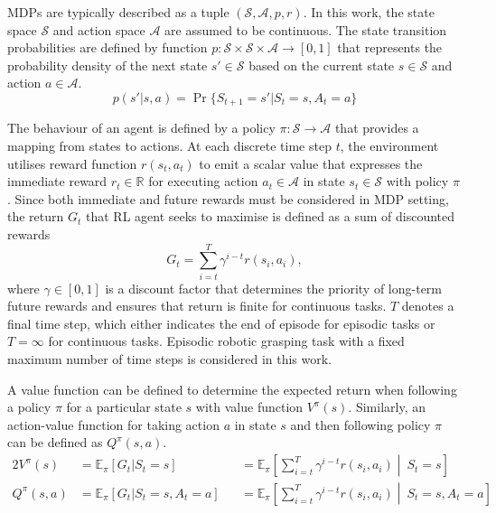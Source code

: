 MDPs are typically described as a tuple \((\mathcal{S}, \mathcal{A}, p, r)\). In this work, the state space \(\mathcal{S}\) and action space \(\mathcal{A}\) are assumed to be continuous. The state transition probabilities are defined by function \(p : \mathcal{S} \times \mathcal{S} \times \mathcal{A} \rightarrow [0, 1]\) that represents the probability density of the next state \(s' \in \mathcal{S}\) based on the current state \(s \in \mathcal{S}\) and action \(a \in \mathcal{A}\).
\begin{equation}
    p(s' \vert s, a) = \Pr\{S_{t+1}{=}s' \vert S_t{=}s, A_{t}{=}a\}
\end{equation}

The behaviour of an agent is defined by a policy \(\pi : \mathcal{S} \rightarrow \mathcal{A}\) that provides a mapping from states to actions. At each discrete time step \(t\), the environment utilises reward function \(r(s_{t}, a_{t})\) to emit a scalar value that expresses the immediate reward \(r_{t} \in \mathbb{R}\) for executing action \(a_{t} \in \mathcal{A}\) in state \(s_{t} \in \mathcal{S}\) with policy \(\pi\). Since both immediate and future rewards must be considered in MDP setting, the return \(G_{t}\) that RL agent seeks to maximise is defined as a sum of discounted rewards
\begin{equation}
    G_{t} = \sum\limits_{i=t}^T \gamma^{i-t} r(s_{i}, a_{i}),
\end{equation}
where \(\gamma \in [0, 1]\) is a discount factor that determines the priority of long-term future rewards and ensures that return is finite for continuous tasks. \(T\) denotes a final time step, which either indicates the end of episode for episodic tasks or \(T=\infty\) for continuous tasks. Episodic robotic grasping task with a fixed maximum number of time steps is considered in this work.

A value function can be defined to determine the expected return when following a policy \(\pi\) for a particular state \(s\) with value function \(V^{\pi}(s)\). Similarly, an action-value function for taking action \(a\) in state \(s\) and then following policy \(\pi\) can be defined as \(Q^{\pi}(s, a)\).
\begin{alignat}{2}
    V^{\pi}(s)    & = \mathbb{E}_{\pi} [G_{t} \vert S_{t}{=}s]            &  & = \mathbb{E}_{\pi} \left[ \sum\limits_{i=t}^T \gamma^{i-t} r(s_{i}, a_{i}) \middle\vert\ S_{t}{=}s \right]
    \label{eq:state_value_function}                                                                                                                                                                  \\
    Q^{\pi}(s, a) & = \mathbb{E}_{\pi} [G_{t} \vert S_{t}{=}s, A_{t}{=}a] &  & = \mathbb{E}_{\pi} \left[ \sum\limits_{i=t}^T \gamma^{i-t} r(s_{i}, a_{i}) \middle\vert\ S_{t}{=}s, A_{t}{=}a \right]
    \label{eq:action_value_function}
\end{alignat}

